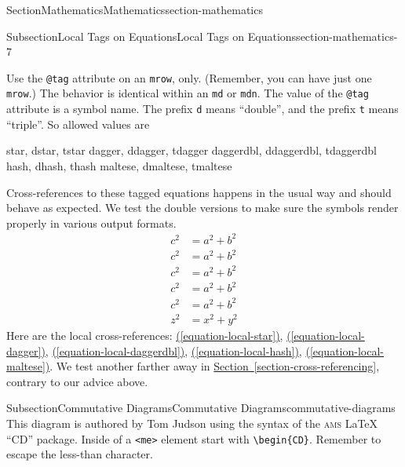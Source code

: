 \documentclass[twoside,10pt,]{article}
\newcommand{\xreffont}{\relax}
\newcommand{\mono}[1]{\texttt{#1}}
\newcommand{\initialism}[1]{\textsc{\MakeLowercase{#1}}}
\numberwithin{equation}{section}
\newcommand{\amp}{&}
\begin{document}
\begin{sectionptx}{Section}{Mathematics}{}{Mathematics}{}{}{section-mathematics}
\begin{subsectionptx}{Subsection}{Local Tags on Equations}{}{Local Tags on Equations}{}{}{section-mathematics-7}
\par
Use the \mono{@tag} attribute on an \mono{mrow}, only.  (Remember, you can have just one \mono{mrow}.)  The behavior is identical within an \mono{md} or \mono{mdn}.  The value of the \mono{@tag} attribute is a symbol name.  The prefix \mono{d} means ``double'', and the prefix \mono{t} means ``triple''.  So allowed values are%
\begin{codedisplay}
star, dstar, tstar
dagger, ddagger, tdagger
daggerdbl, ddaggerdbl, tdaggerdbl
hash, dhash, thash
maltese, dmaltese, tmaltese
\end{codedisplay}
Cross-references to these tagged equations happens in the usual way and should behave as expected.  We test the double versions to make sure the symbols render properly in various output formats.%
\begin{align}
c^2 \amp = a^2+b^2\tag{\textasteriskcentered\textasteriskcentered}\label{equation-local-star}\\
c^2 \amp = a^2+b^2\tag{\textdagger\textdagger}\label{equation-local-dagger}\\
c^2 \amp = a^2+b^2\tag{\textdaggerdbl\textdaggerdbl}\label{equation-local-daggerdbl}\\
c^2 \amp = a^2+b^2\tag{\#\#}\label{equation-local-hash}\\
c^2 \amp = a^2+b^2\tag{\maltese\maltese}\label{equation-local-maltese}\\
z^2 \amp = x^2+y^2\label{section-mathematics-7-3-12-6}
\end{align}
Here are the local cross-references: \hyperref[equation-local-star]{({\xreffont\ref{equation-local-star}})}, \hyperref[equation-local-dagger]{({\xreffont\ref{equation-local-dagger}})}, \hyperref[equation-local-daggerdbl]{({\xreffont\ref{equation-local-daggerdbl}})}, \hyperref[equation-local-hash]{({\xreffont\ref{equation-local-hash}})}, \hyperref[equation-local-maltese]{({\xreffont\ref{equation-local-maltese}})}.  We test another farther away in \hyperref[section-cross-referencing]{Section~{\xreffont\ref{section-cross-referencing}}}, contrary to our advice above.%
\end{subsectionptx}
%
%
\typeout{************************************************}
\typeout{************************************************}
%
\begin{subsectionptx}{Subsection}{Commutative Diagrams}{}{Commutative Diagrams}{}{}{commutative-diagrams}
This diagram is authored by Tom Judson using the syntax of the \initialism{AMS} \LaTeX{} ``CD'' package.  Inside of a \mono{<me>} element start with \mono{\textbackslash{}begin\{CD\}}.  Remember to escape the less-than character.%

\end{subsectionptx}
\end{sectionptx}
\end{document}
